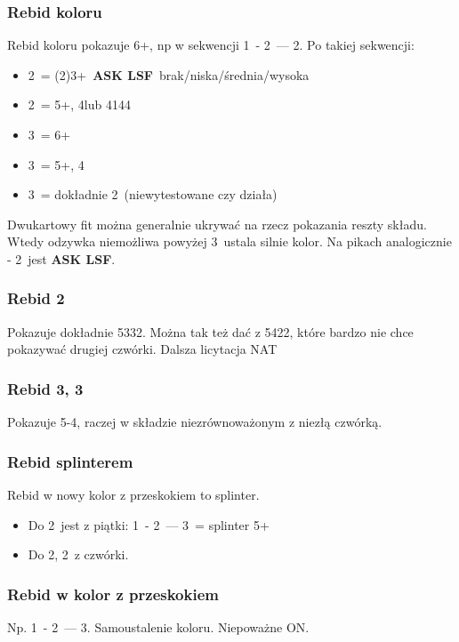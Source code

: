 \documentclass[12pt, a4paper]{article}
\newcommand{\lsf}{\color{WildStrawberry}\textbf{ASK LSF}\color{black}}
\begin{document}
\subsubsection*{Rebid koloru}
    Rebid koloru pokazuje 6+, np w sekwencji 1\hearts\ - 2\clubs\ --- 2\hearts.
    Po takiej sekwencji:
    \begin{itemize}
        \item 2\spades\ = (2)3+\hearts\ \lsf\ brak/niska/średnia/wysoka
        \item 2\nt\ = 5+\clubs, 4\spades lub 4144
        \item 3\clubs\ = 6+\clubs
        \item 3\diams\ = 5+\clubs, 4\diams
        \item 3\hearts\ = dokładnie 2\hearts\ (niewytestowane czy działa)
    \end{itemize}
    Dwukartowy fit można generalnie ukrywać na rzecz pokazania reszty składu. Wtedy odzywka niemożliwa powyżej
    3\nt\ ustala silnie kolor.
    Na pikach analogicznie - 2\nt\ jest \lsf.

\subsubsection*{Rebid 2\ntx}
    Pokazuje dokładnie 5332. Można tak też dać z 5422, które bardzo nie chce pokazywać drugiej czwórki.
    Dalsza licytacja NAT

\subsubsection*{Rebid 3\clubs, 3\diams}
    Pokazuje 5-4, raczej w składzie niezrównoważonym z niezłą czwórką.

\subsubsection*{Rebid splinterem}
    Rebid w nowy kolor z przeskokiem to splinter.
    \begin{itemize}
        \item Do 2\clubs\ jest z piątki: 1\spades\ - 2\clubs\ --- 3\diams\ = splinter 5+\clubs
        \item Do 2\diams, 2\hearts\ z czwórki.
    \end{itemize}

\subsubsection*{Rebid w kolor z przeskokiem}
    Np. 1\spades\ - 2\diams\ --- 3\spades. Samoustalenie koloru. Niepoważne ON.
\end{document}
